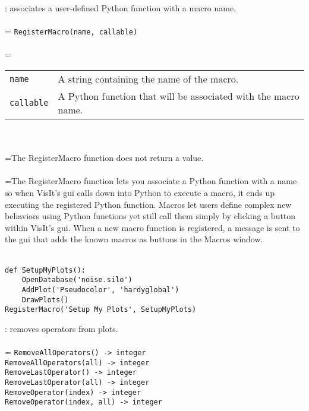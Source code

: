 \documentclass[10pt,a4paper]{report}
\begin{document}
{}
: associates a user-defined Python function with a macro name.\\[-3mm]

 \\ 
\hangindent=\parindent 
\verb!RegisterMacro(name, callable)!\\ [-3mm]

 \\ 
\hangindent=\parindent 
\begin{tabular}{lp{9cm}}
\verb!name! & A string containing the name of the macro. \\
\verb!callable! & A Python function that will be associated with the macro name. \\
\end{tabular} \\[-2mm]


 \\ 
\hangindent=\parindent The RegisterMacro function does not return a value. \\[-3mm] 

 \\ 
\hangindent=\parindent The RegisterMacro function lets you associate a Python function with a name so when VisIt's gui calls down into Python to execute a macro, it ends up executing the registered Python function. Macros let users define complex new behaviors using Python functions yet still call them simply by clicking a button within VisIt's gui. When a new macro function is registered, a  message is sent to the gui that adds the known macros as buttons in the Macros window. \\[-3mm] 

\\[-6mm]
\begin{verbatim}def SetupMyPlots():
    OpenDatabase('noise.silo')
    AddPlot('Pseudocolor', 'hardyglobal')
    DrawPlots()
RegisterMacro('Setup My Plots', SetupMyPlots)
\end{verbatim}
\newpage


{}
: removes operators from plots.\\[-3mm]

 \\ 
\hangindent=\parindent 
\verb!RemoveAllOperators() -> integer!\\ 
\verb!RemoveAllOperators(all) -> integer!\\ 
\verb!RemoveLastOperator() -> integer!\\ 
\verb!RemoveLastOperator(all) -> integer!\\ 
\verb!RemoveOperator(index) -> integer!\\ 
\verb!RemoveOperator(index, all) -> integer!\\ [-3mm]
\end{document}
